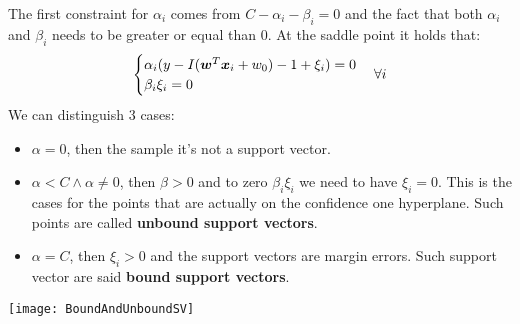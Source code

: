The first constraint for $\alpha_i$ comes from $C-\alpha_i-\beta_i=0$ and the fact that both $\alpha_i$ and $\beta_i$ needs to be greater or equal than 0. \newline
At the saddle point it holds that:
\[
\begin{cases}
  \alpha_i(y-I(\bm{w}^T\bm{x}_i+w_0)-1+\xi_i)=0\\
  \beta_i\xi_i=0
\end{cases}
\forall i
\]
We can distinguish 3 cases:
\begin{itemize}
  \item $\alpha=0$, then the sample it's not a support vector.
  \item $\alpha<C\wedge\alpha\neq0$, then $\beta>0$ and to zero $\beta_i\xi_i$ we need to have $\xi_i=0$. This is the cases for the points that are actually on the confidence one hyperplane. Such points are called \textbf{unbound support vectors}.
  \item $\alpha=C$, then $\xi_i>0$ and the support vectors are margin errors. Such support vector are said \textbf{bound support vectors}.
\end{itemize}
\begin{center}
  \texttt{[image: BoundAndUnboundSV]}
\end{center}
%
%
%
